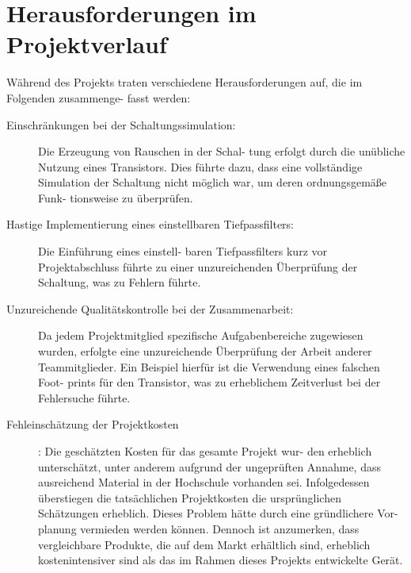 \section{Herausforderungen im Projektverlauf}
Während des Projekts traten verschiedene Herausforderungen auf, die im Folgenden zusammenge-
fasst werden:
\begin{description}
\item[Einschränkungen bei der Schaltungssimulation:] Die Erzeugung von Rauschen in der Schal-
tung erfolgt durch die unübliche Nutzung eines Transistors. Dies führte dazu, dass eine
vollständige Simulation der Schaltung nicht möglich war, um deren ordnungsgemäße Funk-
tionsweise zu überprüfen.
\item[Hastige Implementierung eines einstellbaren Tiefpassfilters:] Die Einführung eines einstell-
baren Tiefpassfilters kurz vor Projektabschluss führte zu einer unzureichenden  Überprüfung
der Schaltung, was zu Fehlern führte.
\item[Unzureichende Qualitätskontrolle bei der Zusammenarbeit:] Da jedem Projektmitglied spezifische Aufgabenbereiche zugewiesen wurden, erfolgte eine unzureichende Überprüfung der
Arbeit anderer Teammitglieder. Ein Beispiel hierfür ist die Verwendung eines falschen Foot-
prints für den Transistor, was zu erheblichem Zeitverlust bei der Fehlersuche führte.
\item[Fehleinschätzung der Projektkosten]: Die geschätzten Kosten für das gesamte Projekt wur-
den erheblich unterschätzt, unter anderem aufgrund der ungeprüften Annahme, dass ausreichend Material
in der Hochschule vorhanden sei. Infolgedessen überstiegen die tatsächlichen Projektkosten
die ursprünglichen Schätzungen erheblich. Dieses Problem hätte durch eine gründlichere Vor-
planung vermieden werden können. Dennoch ist anzumerken, dass vergleichbare Produkte, die auf dem Markt erhältlich sind, erheblich kostenintensiver sind als das im Rahmen dieses Projekts entwickelte Gerät.

\end{description}